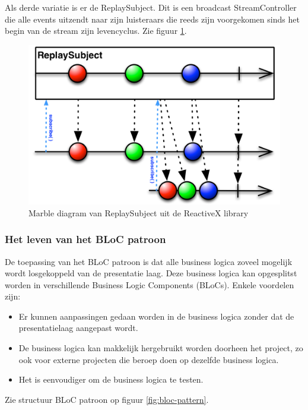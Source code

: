 Als derde variatie is er de ReplaySubject. Dit is een broadcast StreamController die alle events uitzendt naar zijn luisteraars die reeds zijn voorgekomen sinds het begin van de stream zijn levencyclus. Zie figuur \ref{fig:rxdart-replaysubject}.

\begin{figure}[H]
    \centering
    \includegraphics[width=\figureWidthModifier\linewidth]{img/stand-van-zaken/rxdart-replaysubject.png}
    \caption{Marble diagram van ReplaySubject uit de ReactiveX library\autocite{Boelens2018}}
    \label{fig:rxdart-replaysubject}
\end{figure}

\subsubsection{Het leven van het BLoC patroon}
De toepassing van het BLoC patroon is dat alle business logica zoveel mogelijk wordt losgekoppeld van de presentatie laag. Deze business logica kan opgesplitst worden in verschillende Business Logic Components (BLoCs). 
\newline
Enkele voordelen zijn: 
\begin{itemize}
    \item Er kunnen aanpassingen gedaan worden in de business logica zonder dat de presentatielaag aangepast wordt.
    \item De business logica kan makkelijk hergebruikt worden doorheen het project, zo ook voor externe projecten die beroep doen op dezelfde business logica.
    \item Het is eenvoudiger om de business logica te testen.
\end{itemize}
Zie structuur BLoC patroon op figuur \ref{fig:bloc-pattern}.

